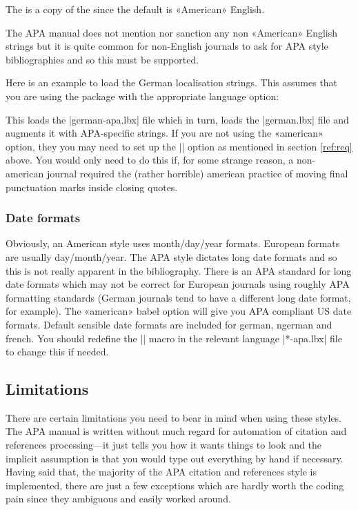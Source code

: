 \documentclass{ltxdockit}
\begin{document}
\begin{ltxcode}
\end{ltxcode}

The  is a copy of the  since
the default is «American» English.

The APA manual does not mention nor sanction any non «American» English
strings but it is quite common for non-English journals to ask for APA style
bibliographies and so this must be supported.

Here is an example to load the German localisation strings. This assumes
that you are using the  package with the appropriate language
option:

\begin{ltxcode}
\end{ltxcode}

This loads the |german-apa.lbx| file which in turn, loads the |german.lbx|
file and augments it with APA-specific strings. If you are not using the
 «american» option, they you may need to set up the
|\DeclareQuotePunctuation| option as mentioned in section \ref{ref:req} above.
You would only need to do this if, for some strange reason, a non-american
journal required the (rather horrible) american practice of moving final
punctuation marks inside closing quotes.

\subsubsection{Date formats}

Obviously, an American style uses month/day/year formats. European formats
are usually day/month/year. The APA style dictates long date formats and so
this is not really apparent in the bibliography. There is an APA standard
for long date formats which may not be correct for European journals using
roughly APA formatting standards (German journals tend to have a different
long date format, for example). The «american» babel option will give you
APA compliant US date formats. Default sensible date formats are included
for german, ngerman and french. You should redefine the |\mkbibdatelong|
macro in the relevant language |*-apa.lbx| file to change this if needed.

\subsection{Limitations}
\label{use:limit}
There are certain limitations you need to bear in mind when using these
styles. The APA manual is written without much regard for automation of
citation and references processing---it just tells you how it wants things to
look and the implicit assumption is that you would type out everything by
hand if necessary. Having said that, the majority of the APA citation
and references style is implemented, there are just a few exceptions which
are hardly worth the coding pain since they ambiguous and easily worked
around.
\end{document}
